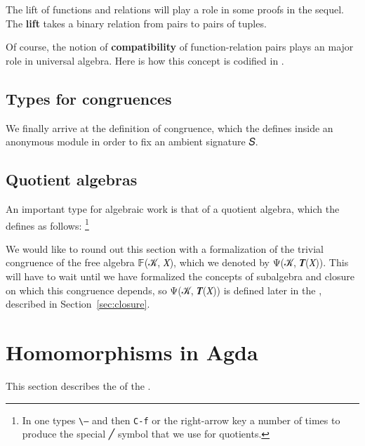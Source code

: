 \documentclass[a4paper,USenglish,cleveref,autoref,thm-restate]{lipics-v2019}
\begin{document}
The lift of functions and relations will play a role in some proofs in the sequel. The \textbf{lift} takes a binary relation from pairs to pairs of tuples.
\begin{code}\end{code}
Of course, the notion of \textbf{compatibility} of function-relation pairs plays an major role in universal algebra. Here is how this concept is codified in \agdaualib.
\begin{code}\end{code}

\subsection{Types for congruences}\label{sec:types-for-congruences}
We finally arrive at the definition of congruence, which the \agdaualib defines inside an anonymous module in order to fix an ambient signature \ab 𝑆.
\begin{code}\end{code}

\subsection{Quotient algebras}
An important type for algebraic work is that of a quotient algebra, which the \agdaualib defines as follows:%
\footnote{In \emacs \agdamode one types \texttt{\textbackslash ---} and then \texttt{C-f} or the right-arrow key a number of times to produce the special ╱ symbol that we use for quotients.}
\begin{code}\end{code}


We would like to round out this section with a formalization of the trivial congruence of the free algebra 𝔽(𝒦, 𝑋), which we denoted by Ψ(𝒦, 𝑻(𝑋)). This will have to wait until we have formalized the concepts of subalgebra and closure on which this congruence depends, so Ψ(𝒦, 𝑻(𝑋)) is defined later in the \closuremodule, described in Section~\ref{sec:closure}.

\section{Homomorphisms in Agda}\label{sec:homs-in-agda}
This section describes the \homsmodule of the \agdaualib.
\end{document}

